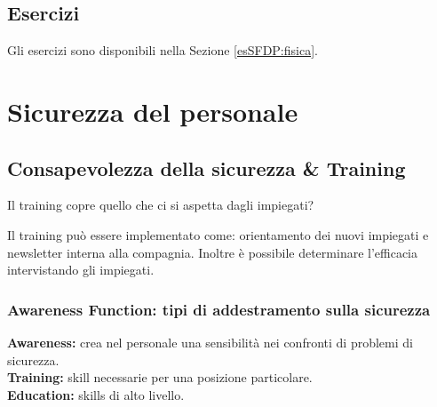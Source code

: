 \subsection{Esercizi}

Gli esercizi sono disponibili nella Sezione \ref{esSFDP:fisica}.

\section{Sicurezza del personale}
\label{SFDP:DP}

\subsection{Consapevolezza della sicurezza \& Training}

Il training copre quello che ci si aspetta dagli impiegati?

Il training può essere implementato come: orientamento dei nuovi impiegati e
newsletter interna alla compagnia. Inoltre è possibile determinare l'efficacia
intervistando gli impiegati.


\subsubsection{Awareness Function: tipi di addestramento sulla sicurezza}

\textbf{Awareness:} crea nel personale una sensibilità nei confronti di problemi di
sicurezza.\\
\newline
\textbf{Training:} skill necessarie per una posizione particolare.\\
\newline
\textbf{Education:} skills di alto livello.\\
